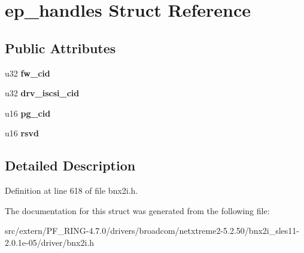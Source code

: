 \hypertarget{structep__handles}{
\section{ep\_\-handles Struct Reference}
\label{structep__handles}
}
\subsection*{Public Attributes}
\begin{DoxyCompactItemize}
\item 
\hypertarget{structep__handles_a967fb1b9f239cfcbe59bb588f13a2449}{
u32 {\bfseries fw\_\-cid}}
\label{structep__handles_a967fb1b9f239cfcbe59bb588f13a2449}

\item 
\hypertarget{structep__handles_af46e1faba862dd39e347db6a41993d7b}{
u32 {\bfseries drv\_\-iscsi\_\-cid}}
\label{structep__handles_af46e1faba862dd39e347db6a41993d7b}

\item 
\hypertarget{structep__handles_a435d43fb0173e2478e65f95f52049e55}{
u16 {\bfseries pg\_\-cid}}
\label{structep__handles_a435d43fb0173e2478e65f95f52049e55}

\item 
\hypertarget{structep__handles_a860c9e26ac4f98a0672a130230e26264}{
u16 {\bfseries rsvd}}
\label{structep__handles_a860c9e26ac4f98a0672a130230e26264}

\end{DoxyCompactItemize}


\subsection{Detailed Description}


Definition at line 618 of file bnx2i.h.



The documentation for this struct was generated from the following file:\begin{DoxyCompactItemize}
\item 
src/extern/PF\_\-RING-\/4.7.0/drivers/broadcom/netxtreme2-\/5.2.50/bnx2i\_\-sles11-\/2.0.1e-\/05/driver/bnx2i.h\end{DoxyCompactItemize}
